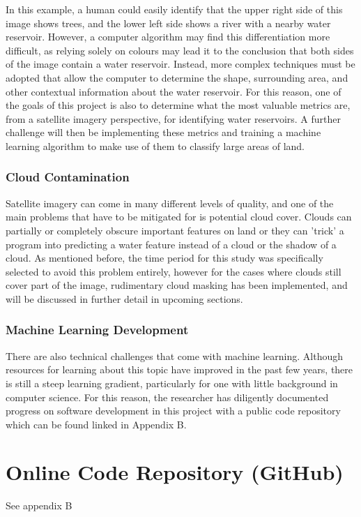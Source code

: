 In this example, a human could easily identify that the upper right side of this image shows trees, and the lower left side shows a river with a nearby water reservoir. However, a computer algorithm may find this differentiation more difficult, as relying solely on colours may lead it to the conclusion that both sides of the image contain a water reservoir. Instead, more complex techniques must be adopted that allow the computer to determine the shape, surrounding area, and other contextual information about the water reservoir. For this reason, one of the goals of this project is also to determine what the most valuable metrics are, from a satellite imagery perspective, for identifying water reservoirs. A further challenge will then be implementing these metrics and training a machine learning algorithm to make use of them to classify large areas of land. 

\subsubsection{Cloud Contamination}
Satellite imagery can come in many different levels of quality, and one of the main problems that have to be mitigated for is potential cloud cover. Clouds can partially or completely obscure important features on land or they can 'trick' a program into predicting a water feature instead of a cloud or the shadow of a cloud. As mentioned before, the time period for this study was specifically selected to avoid this problem entirely, however for the cases where clouds still cover part of the image, rudimentary cloud masking has been implemented, and will be discussed in further detail in upcoming sections. 

\subsubsection{Machine Learning Development}
There are also technical challenges that come with machine learning. Although resources for learning about this topic have improved in the past few years, there is still a steep learning gradient, particularly for one with little background in computer science. For this reason, the researcher has diligently documented progress on software development in this project with a public code repository which can be found linked in Appendix B. 

\section{Online Code Repository (GitHub)}
See appendix B
